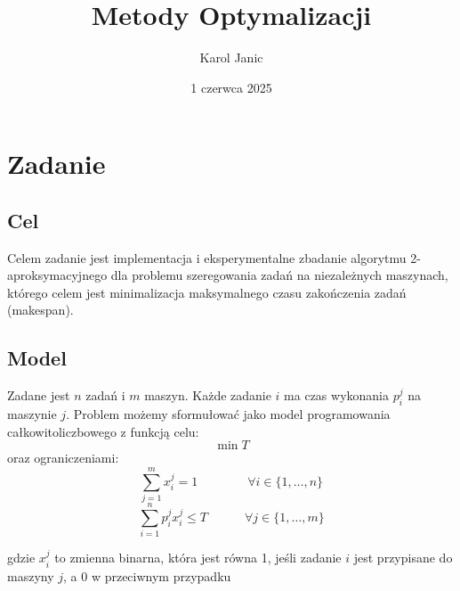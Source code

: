 \documentclass{article}
\title{Metody Optymalizacji}
\author{Karol Janic}
\date{1 czerwca 2025}
\begin{document}
\begin{titlingpage}
    \maketitle
\end{titlingpage}

\tableofcontents

\newpage

\section{Zadanie}
\subsection{Cel}
Celem zadanie jest implementacja i eksperymentalne zbadanie algorytmu 2-aproksymacyjnego dla problemu szeregowania zadań na niezależnych maszynach,
którego celem jest minimalizacja maksymalnego czasu zakończenia zadań (makespan).

\subsection{Model}
Zadane jest $n$ zadań i $m$ maszyn. Każde zadanie $i$ ma czas wykonania $p_i^j$ na maszynie $j$. 
Problem możemy sformułować jako model programowania całkowitoliczbowego z funkcją celu:
\begin{equation}
    \min T
\end{equation}
oraz ograniczeniami:
\begin{equation}
    \sum_{j=1}^{m} x_i^j = 1 \quad \quad \qquad \forall i \in \{1, \ldots, n\}
\end{equation}
\begin{equation}
    \sum_{i=1}^{n} p_i^j x_i^j \leq T \quad \quad \quad \forall j \in \{1, \ldots, m\}
\end{equation}

gdzie $x_i^j$ to zmienna binarna, która jest równa 1, jeśli zadanie $i$ jest przypisane do maszyny $j$, a 0 w przeciwnym przypadku
\end{document}
